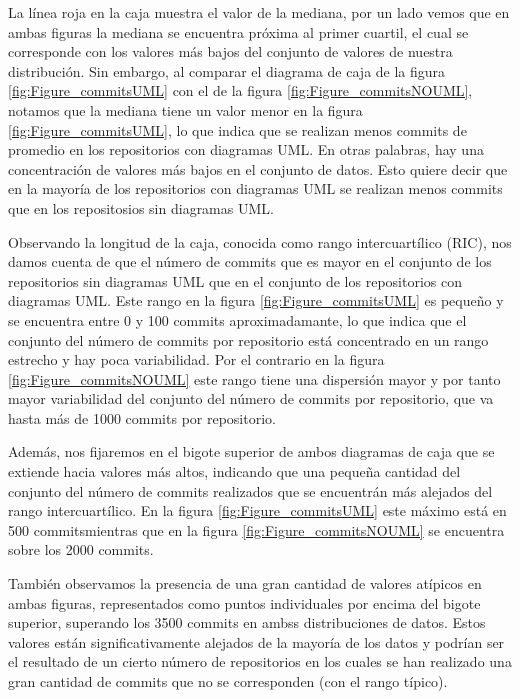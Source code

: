 \documentclass[a4paper, 12pt]{book}
\begin{document}
La línea roja en la caja muestra el valor de la mediana, por un lado vemos que en ambas figuras la mediana se encuentra próxima al primer cuartil, el cual se corresponde con los valores más bajos del conjunto de valores de nuestra distribución. 
Sin embargo, al comparar el diagrama de caja de la figura \ref{fig:Figure_commitsUML} con el de la figura \ref{fig:Figure_commitsNOUML}, notamos que la mediana tiene un valor menor en la figura \ref{fig:Figure_commitsUML}, lo que indica que se realizan menos commits de promedio en los repositorios con diagramas UML. 
En otras palabras, hay una concentración de valores más bajos en el conjunto de datos. 
Esto quiere decir que en la mayoría de los repositorios con diagramas UML se realizan menos commits que en los repositosios sin diagramas UML.

 
Observando la longitud de la caja, conocida como rango intercuartílico (RIC), nos damos cuenta de que el número de commits que es mayor en el conjunto de los repositorios sin diagramas UML que en el conjunto de los repositorios con diagramas UML.
Este rango en la figura \ref{fig:Figure_commitsUML} es pequeño y se encuentra entre 0 y 100 commits aproximadamante, lo que indica que el conjunto del número de commits por repositorio está concentrado en un rango estrecho y hay poca variabilidad.
Por el contrario en la figura \ref{fig:Figure_commitsNOUML} este rango tiene una dispersión mayor y por tanto mayor variabilidad del conjunto del número de commits por repositorio, que va hasta más de 1000 commits por repositorio.


Además, nos fijaremos en el bigote superior de ambos diagramas de caja que se extiende hacia valores más altos, indicando que una pequeña cantidad del conjunto del número de commits realizados que se encuentrán más alejados del rango intercuartílico.
En la figura \ref{fig:Figure_commitsUML} este máximo está en 500 commitsmientras que en la figura \ref{fig:Figure_commitsNOUML} se encuentra sobre los 2000 commits.


También observamos la presencia de una gran cantidad de valores atípicos en ambas figuras, representados como puntos individuales por encima del bigote superior, superando los 3500 commits en ambss distribuciones de datos. 
Estos valores están significativamente alejados de la mayoría de los datos y podrían ser el resultado de un cierto número de repositorios en los cuales se han realizado una gran cantidad de commits que no se corresponden (con el rango típico). 
\end{document}
